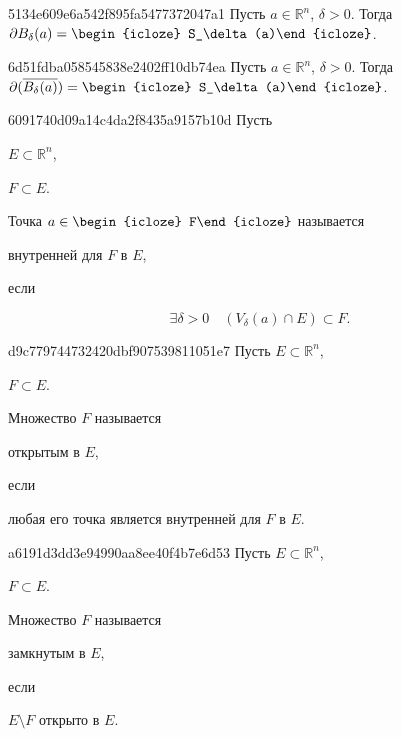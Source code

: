 \begin{note}{5134e609e6a542f895fa5477372047a1}
    Пусть \({ a \in \mathbb R^{n} }\),\: \({ \delta > 0 }\).
    Тогда \({ \partial B_\delta(a) = \begin{icloze}{1}S_\delta(a)\end{icloze} }\).
\end{note}

\begin{note}{6d51fdba058545838e2402ff10db74ea}
    Пусть \({ a \in \mathbb R^{n} }\),\: \({ \delta > 0 }\).
    Тогда \({ \partial(\overline{B_\delta(a)}) = \begin{icloze}{1}S_\delta(a)\end{icloze} }\).
\end{note}

\begin{note}{6091740d09a14c4da2f8435a9157b10d}
    Пусть \begin{icloze}{5}\({ E \subset \mathbb R^{n} }\),\end{icloze} \begin{icloze}{3}\({ F \subset E }\).\end{icloze}
    Точка \({ a \in \begin{icloze}{4}F\end{icloze} }\) называется \begin{icloze}{2}внутренней для \({ F }\) в \({ E }\),\end{icloze} если
    \begin{icloze}{1}
        \[
            \exists \delta > 0 \quad (V_{\delta}(a) \cap E) \subset F.
        \]
    \end{icloze}
\end{note}

\begin{note}{d9c779744732420dbf907539811051e7}
    Пусть \({ E \subset \mathbb R^{n} }\), \begin{icloze}{3}\({ F \subset E }\).\end{icloze}
    Множество \({ F }\) называется \begin{icloze}{2}открытым в \({ E }\),\end{icloze} если \begin{icloze}{1}любая его точка является внутренней для \({ F }\) в \({ E }\).\end{icloze}
\end{note}

\begin{note}{a6191d3dd3e94990aa8ee40f4b7e6d53}
    Пусть \({ E \subset \mathbb R^{n} }\), \begin{icloze}{3}\({ F \subset E }\).\end{icloze}
    Множество \({ F }\) называется \begin{icloze}{2}замкнутым в \({ E }\),\end{icloze} если \begin{icloze}{1}\({ E \setminus F }\) открыто в \({ E }\).\end{icloze}
\end{note}

